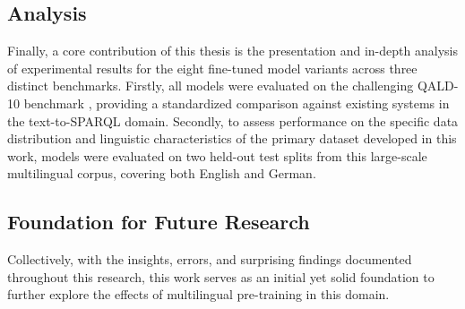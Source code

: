 \subsection{Analysis}
Finally, a core contribution of this thesis is the presentation and in-depth analysis of experimental results for the eight fine-tuned model variants across three distinct benchmarks.
Firstly, all models were evaluated on the challenging QALD-10 benchmark \cite{usbeck2024qald}, providing a standardized comparison against existing systems in the text-to-SPARQL domain.
Secondly, to assess performance on the specific data distribution and linguistic characteristics of the primary dataset developed in this work, models were evaluated on two held-out test splits from this large-scale multilingual corpus, covering both English and German.

\subsection{Foundation for Future Research}
Collectively, with the insights, errors, and surprising findings documented throughout this research, this work serves as an initial yet solid foundation to further explore the effects of multilingual pre-training in this domain.